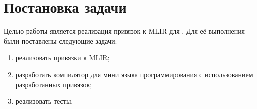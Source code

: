 
\section{Постановка задачи}
\label{sec:task}
Целью работы является реализация привязок к MLIR для \OCaml{}. Для её выполнения были поставлены следующие задачи:

\begin{enumerate}
	\item реализовать привязки к MLIR;
	\item разработать компилятор для мини языка программирования с использованием разработанных привязок;
	\item реализовать тесты.
\end{enumerate}
